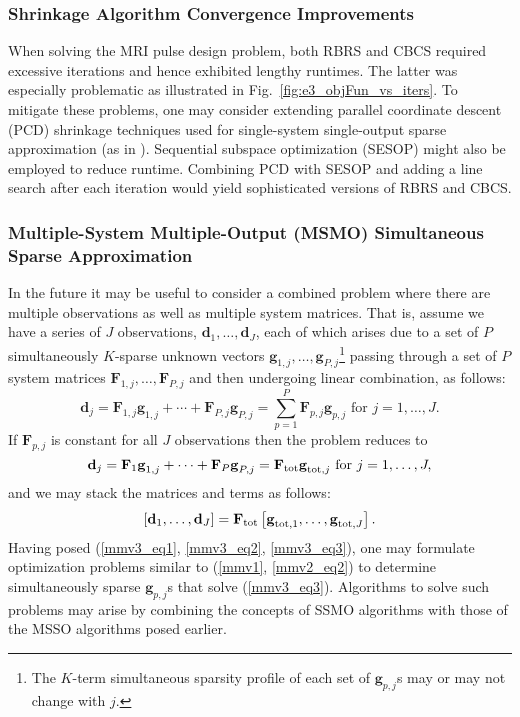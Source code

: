 \documentclass[final]{siamltex}
\newcommand{\la}[1]{\mbox{$\mathbf{#1}$}}  \newcommand{\sst}[1]{\mbox{\scriptsize{#1}}}
\begin{document}
   \subsubsection{Shrinkage Algorithm Convergence Improvements} When
   solving the MRI pulse design problem, both RBRS and CBCS required
   excessive iterations and hence exhibited lengthy runtimes.  The
   latter was especially problematic as illustrated in
   Fig.~\ref{fig:e3_objFun_vs_iters}.  To mitigate these problems, one
   may consider extending parallel coordinate descent (PCD) shrinkage
   techniques used for single-system single-output sparse
   approximation (as in \cite{Ela2006_TransIT, Ela2006}).  Sequential
   subspace optimization (SESOP) \cite{Ela2007} might also be employed
   to reduce runtime.  Combining PCD with SESOP and adding a line
   search after each iteration would yield sophisticated versions of
   RBRS and CBCS\@.

   \subsubsection{Multiple-System Multiple-Output (MSMO) Simultaneous
   Sparse Approximation} In the future it may be useful to consider a
   combined problem where there are multiple observations as well as
   multiple system matrices.  That is, assume we have a series of $J$
   observations, $\la{d}_1, \ldots, \la{d}_J$, each of which arises
   due to a set of $P$ simultaneously $K$-sparse unknown vectors
   $\la{g}_{1,j}, \ldots, \la{g}_{P,j}$\footnote{The $K$-term
   simultaneous sparsity profile of each set of $\la{g}_{p,j}$s may or
   may not change with $j$.}  passing through a set of $P$ system
   matrices $\la{F}_{1,j}, \ldots, \la{F}_{P,j}$ and then undergoing
   linear combination, as follows:
   \begin{equation}\label{mmv3_eq1}
       \la{d}_j = \la{F}_{1,j} \la{g}_{1,j} + \cdots + \la{F}_{P,j} \la{g}_{P,j}
           = \sum_{p=1}^{P} \la{F}_{p,j} \la{g}_{p,j}
              \mbox{ for } j = 1, \ldots, J.
   \end{equation}
   If $\la{F}_{p,j}$ is constant for all $J$ observations then the
   problem reduces to
   \begin{equation}\label{mmv3_eq2}
       \la{d}_j = \la{F}_{1} \la{g}_{1,j} + \cdots + \la{F}_{P} \la{g}_{P,j}
            = \la{F}_{\sst{tot}} \la{g}_{\sst{tot}, j}
              \mbox{ for } j = 1, \ldots, J,
   \end{equation}
   and we may stack the matrices and terms as follows:
   \begin{equation}\label{mmv3_eq3}
       \left[ \la{d}_1, \ldots, \la{d}_J \right] = 
           \la{F}_{\sst{tot}} \left[ \la{g}_{\sst{tot},1}, \ldots, \la{g}_{\sst{tot},J} \right].
   \end{equation}
   Having posed (\ref{mmv3_eq1}, \ref{mmv3_eq2}, \ref{mmv3_eq3}), one
   may formulate optimization problems similar to (\ref{mmv1},
   \ref{mmv2_eq2}) to determine simultaneously sparse $\la{g}_{p,j}$s
   that solve (\ref{mmv3_eq3}).  Algorithms to solve such problems may
   arise by combining the concepts of SSMO algorithms
   \cite{Cot2005,Mal2005,Tro2006_I,Tro2006_II} with those of the MSSO
   algorithms posed earlier.
\end{document}
